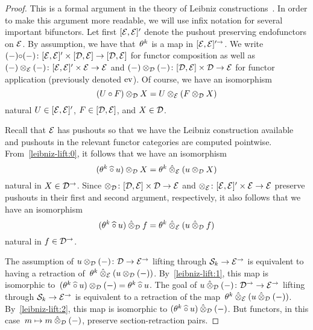 \documentclass[reqno,10pt,a4paper,oneside,draft]{amsart}
\begin{document}
\begin{proof}
This is a formal argument in the theory of Leibniz constructions~\cite{riehl-verity:reedy}.
In order to make this argument more readable, we will use infix notation for several important bifunctors.
Let first $[\catE, \catE]'$ denote the pushout preserving endofunctors on $\catE$.
By assumption, we have that~$\thetak$ is a map in $[\catE, \catE]'^{\to}$.
We write $(-) {\cc} (-)  \co [\catE, \catE]' \times [\cal{D}, \catE] \to [\cal{D}, \catE]$ for functor composition as well as~$(-) \otimes_\catE (-) \co [\catE, \catE]' \times \catE \to \catE$ and $(-) \otimes_{\cal{D}} (-) \co [\cal{D}, \catE] \times \cal{D} \to \catE$ for functor application (previously denoted $\eval$).
Of course, we have an isomorphism
\begin{equation} \label{leibniz-lift:0}
  (U \cc F) \otimes_{\cal{D}} X = U \otimes_\catE (F \otimes_{\cal{D}} X)
\end{equation}
natural $U \in [\catE, \catE]'$, $F \in [\cal{D}, \catE]$, and $X \in \cal{D}$.

Recall that $\catE$ has pushouts so that we have the Leibniz construction available and pushouts in the relevant functor categories are computed pointwise.
From~\eqref{leibniz-lift:0}, it follows that we have an isomorphism
\begin{equation} \label{leibniz-lift:1}
  (\thetak \cchat u) \otimes_{\cal{D}} X = \thetak \hatotimes_\catE (u \otimes_{\cal{D}} X)
\end{equation}
natural in $X \in \cal{D}^\to$.
Since $\otimes_{\cal{D}} \co [\cal{D}, \catE] \times \cal{D} \to \catE$ and $\otimes_\catE \co [\catE, \catE]' \times \catE \to \catE$ preserve pushouts in their first and second argument, respectively, it also follows that we have an isomorphism
\begin{equation} \label{leibniz-lift:2}
  (\thetak \cchat u) \hatotimes_{\cal{D}} f = \thetak \hatotimes_\catE (u \hatotimes_{\cal{D}} f)
\end{equation}
natural in $f \in \cal{D}^\to$.

The assumption of $u \otimes_{\cal{D}} (-) \co \cal{D} \to \catE^\to$ lifting through $\cal{S}_k \to \catE^\to$ is equivalent to having a retraction of~$\thetak \hatotimes_\catE (u \otimes_{\cal{D}} (-))$.
By~\eqref{leibniz-lift:1}, this map is isomorphic to~$(\thetak \cchat u) \otimes_{\cal{D}} (-) = \thetak \cchat u$.
The goal of $u \hatotimes_{\cal{D}} (-) \co \cal{D}^\to \to \catE^\to$ lifting through $\cal{S}_k \to \catE^\to$ is equivalent to a retraction of the map~$\thetak \hatotimes_\catE (u \hatotimes_{\cal{D}} (-))$.
By~\eqref{leibniz-lift:2}, this map is isomorphic to $(\thetak \cchat u) \hatotimes_{\cal{D}} (-)$.
But functors, in this case~$m \mapsto m \hatotimes_{\cal{D}} (-)$, preserve section-retraction pairs.
\end{proof}
\end{document}

